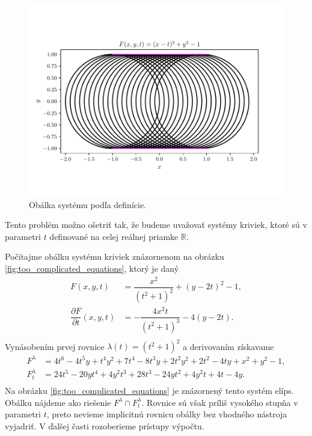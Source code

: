 \begin{figure}[H]
	\centering
	\includegraphics{images/system_with_correct_envelope.pdf}
	\caption{Obálka systému podľa definície.}
	\label{fig:system_with_correct_envelope}
\end{figure}

Tento problém možno ošetriť tak, že budeme uvažovať systémy kriviek, ktoré sú v parametri $t$ definované na celej reálnej priamke $\mathbb{R}$. 

\begin{example}
\label{example:too_complicated_equations}
Počítajme obálku systému kriviek znázornenom na obrázku \ref{fig:too_complicated_equations}, ktorý je daný
\begin{align*}
F(x,y, t) &= \dfrac{x^2}{(t^2 + 1)^2} + (y - 2t)^2 - 1, \\
\dfrac{\partial F}{\partial t}(x, y, t) &= -\dfrac{4x^2t}{\left(t^2+1\right)^3}-4\left(y-2t\right). \\
\end{align*}
Vynásobením prvej rovnice $ \lambda(t) = (t^2 + 1)^2$ a derivovaním získavame
\begin{align*}
F^\lambda &= 4 t^6 - 4 t^5 y + t^4 y^2 + 7 t^4 - 8 t^3 y + 2 t^2 y^2 + 2 t^2 - 4 t y + x^2 + y^2 - 1, \\
F_t^\lambda &= 24t^5-20yt^4+4y^2t^3+28t^3-24yt^2+4y^2t+4t-4y. \\
\end{align*}
Na obrázku \ref{fig:too_complicated_equations} je znázornený tento systém elíps. Obálku nájdeme ako riešenie $F^\lambda \cap F_t^\lambda. $ Rovnice sú však príliš vysokého stupňa v parametri $t$, preto nevieme implicitnú rovnicu obálky bez vhodného nástroja vyjadriť. V ďalšej časti rozoberieme prístupy výpočtu.
\end{example}


